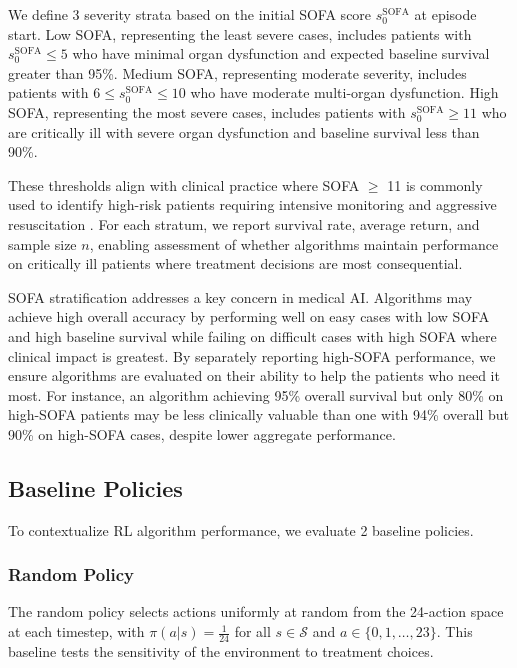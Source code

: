 We define 3 severity strata based on the initial SOFA score $s_0^{\text{SOFA}}$ at episode start. Low SOFA, representing the least severe cases, includes patients with $s_0^{\text{SOFA}} \leq 5$ who have minimal organ dysfunction and expected baseline survival greater than 95\%. Medium SOFA, representing moderate severity, includes patients with $6 \leq s_0^{\text{SOFA}} \leq 10$ who have moderate multi-organ dysfunction. High SOFA, representing the most severe cases, includes patients with $s_0^{\text{SOFA}} \geq 11$ who are critically ill with severe organ dysfunction and baseline survival less than 90\%.

These thresholds align with clinical practice where SOFA $\geq$ 11 is commonly used to identify high-risk patients requiring intensive monitoring and aggressive resuscitation \citep{rhodes2017ssc}. For each stratum, we report survival rate, average return, and sample size $n$, enabling assessment of whether algorithms maintain performance on critically ill patients where treatment decisions are most consequential.

SOFA stratification addresses a key concern in medical AI. Algorithms may achieve high overall accuracy by performing well on easy cases with low SOFA and high baseline survival while failing on difficult cases with high SOFA where clinical impact is greatest. By separately reporting high-SOFA performance, we ensure algorithms are evaluated on their ability to help the patients who need it most. For instance, an algorithm achieving 95\% overall survival but only 80\% on high-SOFA patients may be less clinically valuable than one with 94\% overall but 90\% on high-SOFA cases, despite lower aggregate performance.

\subsection{Baseline Policies}\label{sec:methods:baselines}

To contextualize RL algorithm performance, we evaluate 2 baseline policies.

\subsubsection{Random Policy}

The random policy selects actions uniformly at random from the 24-action space at each timestep, with $\pi(a|s) = \frac{1}{24}$ for all $s \in \mathcal{S}$ and $a \in \{0, 1, \ldots, 23\}$. This baseline tests the sensitivity of the environment to treatment choices.

